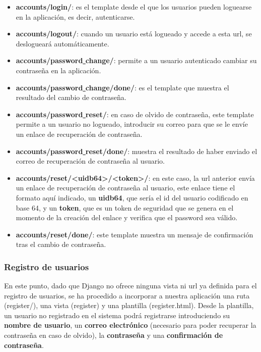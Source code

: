     \begin{itemize}
        \item \textbf{accounts/login/}: es el template desde el que los usuarios pueden
        loguearse en la aplicación, es decir, autenticarse.
        \item \textbf{accounts/logout/}: cuando un usuario está logueado y accede a esta
        url, se deslogueará automáticamente.
        \item \textbf{accounts/password\underline{ }change/}: permite a un usuario
        autenticado cambiar su contraseña en la aplicación.
        \item \textbf{accounts/password\underline{ }change/done/}: es el template que
        muestra el resultado del cambio de contraseña.
        \item \textbf{accounts/password\underline{ }reset/}: en caso de olvido de contraseña,
        este template permite a un usuario no logueado, introducir su correo para que se le
        envíe un enlace de recuperación de contraseña.
        \item \textbf{accounts/password\underline{ }reset/done/}: muestra el resultado de
        haber enviado el correo de recuperación de contraseña al usuario.
        \item \textbf{accounts/reset/<uidb64>/<token>/}: en este caso, la url anterior
        envía un enlace de recuperación de contraseña al usuario, este enlace tiene el
        formato aquí indicado, un \textbf{uidb64}, que sería el id del usuario codificado
        en base 64, y un \textbf{token}, que es un token de seguridad que se genera en
        el momento de la creación del enlace y verifica que el password sea válido.
        \item \textbf{accounts/reset/done/}: este template muestra un mensaje de confirmación
        tras el cambio de contraseña.
    \end{itemize}

\subsubsection{Registro de usuarios}
En este punto, dado que Django no ofrece ninguna vista ni url ya definida para el registro
de usuarios, se ha procedido a incorporar a nuestra aplicación una ruta (register/),
una vista (register) y una plantilla (register.html). Desde la plantilla, un usuario no
registrado en el sistema podrá registrarse introduciendo su \textbf{nombre de usuario}, un
\textbf{correo electrónico} (necesario para poder recuperar la contraseña en caso de
olvido), la \textbf{contraseña} y una \textbf{confirmación de contraseña}.\\

